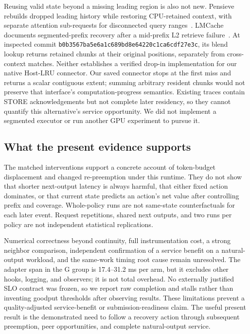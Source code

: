\documentclass[10pt,a4paper]{article}
\begin{document}
Reusing valid state beyond a missing leading region is also not new.
Pensieve rebuilds dropped leading history while restoring CPU-retained
context, with separate attention sub-requests for disconnected query
ranges~\cite{pensieve}. LMCache documents segmented-prefix recovery after a
mid-prefix L2 retrieve failure~\cite{lmcache-segmented}. At inspected commit
\texttt{b0b3567ba5e6a1c689bd8e64220c1ca6cdf27e3c}, its blend lookup returns
retained chunks at their original positions, separately from cross-context
matches. Neither establishes a verified drop-in implementation for our native
Host-LRU connector. Our saved connector stops at the first miss and returns a
scalar contiguous extent; summing arbitrary resident chunks would not preserve
that interface's computation-progress semantics. Existing traces contain STORE
acknowledgements but not complete later residency, so they cannot quantify this
alternative's service opportunity. We did not implement a segmented executor
or run another GPU experiment to pursue it.

\subsection{What the present evidence supports}
The matched interventions support a concrete account of token-budget
displacement and changed re-preemption under this runtime. They do not show
that shorter next-output latency is always harmful, that either fixed action
dominates, or that current state predicts an action's net value after
controlling prefix and coverage. Whole-policy runs are not same-state
counterfactuals for each later event. Request repetitions, shared next outputs,
and two runs per policy are not independent statistical replications.

Numerical correctness beyond continuity, full instrumentation cost, a strong
neighbor comparison, independent confirmation of a service benefit on a
natural-output workload, and
the same-work timing root cause remain unresolved. The adapter span in the G
group is 17.4--31.2 ms per arm, but it excludes other hooks, logging, and
observers; it is not total overhead. No externally justified SLO contract was
frozen, so we report raw completion and stalls rather than inventing goodput
thresholds after observing results. These limitations prevent a quality-adjusted
service-benefit or submission-readiness claim. The useful present result is
the demonstrated need to follow a recovery action through subsequent
preemption, peer opportunities, and complete natural-output service.
\end{document}

